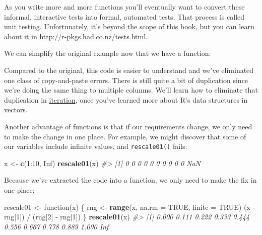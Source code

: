 \documentclass[]{book}
\newenvironment{Shaded}{\begin{snugshade}}{\end{snugshade}}
\newcommand{\KeywordTok}[1]{\textcolor[rgb]{0.13,0.29,0.53}{\textbf{{#1}}}}
\newcommand{\DataTypeTok}[1]{\textcolor[rgb]{0.13,0.29,0.53}{{#1}}}
\newcommand{\DecValTok}[1]{\textcolor[rgb]{0.00,0.00,0.81}{{#1}}}
\newcommand{\StringTok}[1]{\textcolor[rgb]{0.31,0.60,0.02}{{#1}}}
\newcommand{\CommentTok}[1]{\textcolor[rgb]{0.56,0.35,0.01}{\textit{{#1}}}}
\newcommand{\OtherTok}[1]{\textcolor[rgb]{0.56,0.35,0.01}{{#1}}}
\newcommand{\NormalTok}[1]{{#1}}
\begin{document}
As you write more and more functions you'll eventually want to convert
these informal, interactive tests into formal, automated tests. That
process is called unit testing. Unfortunately, it's beyond the scope of
this book, but you can learn about it in
\url{http://r-pkgs.had.co.nz/tests.html}.

We can simplify the original example now that we have a function:

\begin{Shaded}
\end{Shaded}

Compared to the original, this code is easier to understand and we've
eliminated one class of copy-and-paste errors. There is still quite a
bit of duplication since we're doing the same thing to multiple columns.
We'll learn how to eliminate that duplication in
\protect\hyperlink{iteration}{iteration}, once you've learned more about
R's data structures in \protect\hyperlink{vectors}{vectors}.

Another advantage of functions is that if our requirements change, we
only need to make the change in one place. For example, we might
discover that some of our variables include infinite values, and
\texttt{rescale01()} fails:

\begin{Shaded}
\begin{Highlighting}[]
\NormalTok{x <-}\StringTok{ }\KeywordTok{c}\NormalTok{(}\DecValTok{1}\NormalTok{:}\DecValTok{10}\NormalTok{, }\OtherTok{Inf}\NormalTok{)}
\KeywordTok{rescale01}\NormalTok{(x)}
\CommentTok{#>  [1]   0   0   0   0   0   0   0   0   0   0 NaN}
\end{Highlighting}
\end{Shaded}

Because we've extracted the code into a function, we only need to make
the fix in one place:

\begin{Shaded}
\begin{Highlighting}[]
\NormalTok{rescale01 <-}\StringTok{ }\NormalTok{function(x) \{}
  \NormalTok{rng <-}\StringTok{ }\KeywordTok{range}\NormalTok{(x, }\DataTypeTok{na.rm =} \OtherTok{TRUE}\NormalTok{, }\DataTypeTok{finite =} \OtherTok{TRUE}\NormalTok{)}
  \NormalTok{(x -}\StringTok{ }\NormalTok{rng[}\DecValTok{1}\NormalTok{]) /}\StringTok{ }\NormalTok{(rng[}\DecValTok{2}\NormalTok{] -}\StringTok{ }\NormalTok{rng[}\DecValTok{1}\NormalTok{])}
\NormalTok{\}}
\KeywordTok{rescale01}\NormalTok{(x)}
\CommentTok{#>  [1] 0.000 0.111 0.222 0.333 0.444 0.556 0.667 0.778 0.889 1.000   Inf}
\end{Highlighting}
\end{Shaded}
\end{document}
